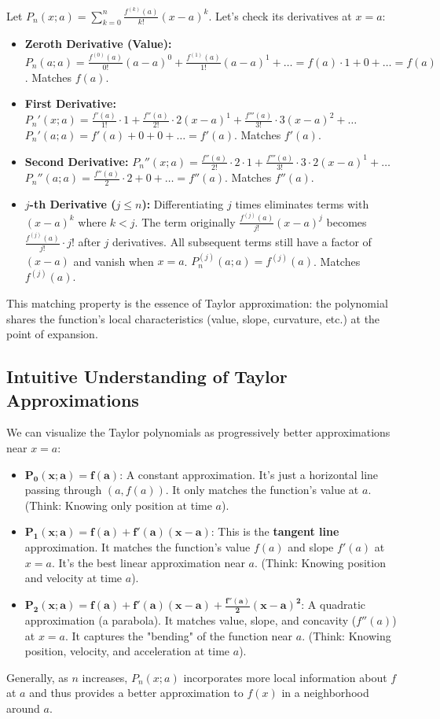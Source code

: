 \documentclass[11pt, a4paper]{article}
\theoremstyle{plain} %
\theoremstyle{definition} %
\begin{document}
Let $P_n(x;a) = \sum_{k=0}^{n} \frac{f^{(k)}(a)}{k!} (x-a)^k$. Let's check its derivatives at $x=a$:
\begin{itemize}
    \item \textbf{Zeroth Derivative (Value):}
    $P_n(a;a) = \frac{f^{(0)}(a)}{0!}(a-a)^0 + \frac{f^{(1)}(a)}{1!}(a-a)^1 + \dots = f(a) \cdot 1 + 0 + \dots = f(a)$.
    Matches $f(a)$.
    \item \textbf{First Derivative:}
    $P_n'(x;a) = \frac{f'(a)}{1!} \cdot 1 + \frac{f''(a)}{2!} \cdot 2(x-a)^1 + \frac{f'''(a)}{3!} \cdot 3(x-a)^2 + \dots$
    $P_n'(a;a) = f'(a) + 0 + 0 + \dots = f'(a)$.
    Matches $f'(a)$.
    \item \textbf{Second Derivative:}
    $P_n''(x;a) = \frac{f''(a)}{2!} \cdot 2 \cdot 1 + \frac{f'''(a)}{3!} \cdot 3 \cdot 2 (x-a)^1 + \dots$
    $P_n''(a;a) = \frac{f''(a)}{2} \cdot 2 + 0 + \dots = f''(a)$.
    Matches $f''(a)$.
    \item \textbf{$j$-th Derivative ($j \le n$):}
    Differentiating $j$ times eliminates terms with $(x-a)^k$ where $k < j$. The term originally $\frac{f^{(j)}(a)}{j!}(x-a)^j$ becomes $\frac{f^{(j)}(a)}{j!} \cdot j!$ after $j$ derivatives. All subsequent terms still have a factor of $(x-a)$ and vanish when $x=a$.
    $P_n^{(j)}(a;a) = f^{(j)}(a)$.
    Matches $f^{(j)}(a)$.
\end{itemize}
This matching property is the essence of Taylor approximation: the polynomial shares the function's local characteristics (value, slope, curvature, etc.) at the point of expansion.

\subsection{Intuitive Understanding of Taylor Approximations}
We can visualize the Taylor polynomials as progressively better approximations near $x=a$:
\begin{itemize}
    \item $\boldsymbol{P_0(x;a) = f(a)}$: A constant approximation. It's just a horizontal line passing through $(a, f(a))$. It only matches the function's value at $a$. (Think: Knowing only position at time $a$).
    \item $\boldsymbol{P_1(x;a) = f(a) + f'(a)(x-a)}$: This is the \textbf{tangent line} approximation. It matches the function's value $f(a)$ and slope $f'(a)$ at $x=a$. It's the best linear approximation near $a$. (Think: Knowing position and velocity at time $a$).
    \item $\boldsymbol{P_2(x;a) = f(a) + f'(a)(x-a) + \frac{f''(a)}{2}(x-a)^2}$: A quadratic approximation (a parabola). It matches value, slope, and concavity ($f''(a)$) at $x=a$. It captures the "bending" of the function near $a$. (Think: Knowing position, velocity, and acceleration at time $a$).
\end{itemize}
Generally, as $n$ increases, $P_n(x;a)$ incorporates more local information about $f$ at $a$ and thus provides a better approximation to $f(x)$ in a neighborhood around $a$.
\end{document}

